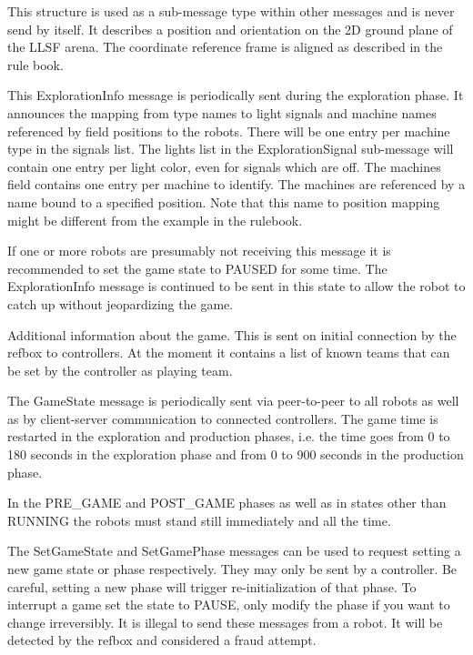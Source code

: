 \documentclass[a4paper]{article}
\begin{document}
%
{%
  This structure is used as a sub-message type within other messages
  and is never send by itself. It describes a position and orientation
  on the 2D ground plane of the LLSF arena. The coordinate reference
  frame is aligned as described in the rule book.
}

%
{%
  This ExplorationInfo message is periodically sent during the
  exploration phase. It announces the mapping from type names to light
  signals and machine names referenced by field positions to the
  robots. There will be one entry per machine type in the signals
  list. The lights list in the ExplorationSignal sub-message will
  contain one entry per light color, even for signals which are
  off. The machines field contains one entry per machine to
  identify. The machines are referenced by a name bound to a specified
  position. Note that this name to position mapping might be different
  from the example in the rulebook.

  \medskip
  If one or more robots are presumably not receiving this message it
  is recommended to set the game state to PAUSED for some time. The
  ExplorationInfo message is continued to be sent in this state to
  allow the robot to catch up without jeopardizing the game.
}

%
{%
  Additional information about the game. This is sent on initial
  connection by the refbox to controllers. At the moment it contains a
  list of known teams that can be set by the controller as playing
  team.
}

%
{%
  The GameState message is periodically sent via peer-to-peer to all
  robots as well as by client-server communication to connected
  controllers. The game time is restarted in the exploration and
  production phases, i.e. the time goes from 0 to 180 seconds in the
  exploration phase and from 0 to 900 seconds in the production phase.

  \medskip

  In the PRE\_GAME and POST\_GAME phases as well as in states other
  than RUNNING the robots must stand still immediately and all the
  time.

  \medskip

  The SetGameState and SetGamePhase messages can be used to request
  setting a new game state or phase respectively. They may only be
  sent by a controller. Be careful, setting a new phase will trigger
  re-initialization of that phase. To interrupt a game set the state
  to PAUSE, only modify the phase if you want to change
  irreversibly. It is illegal to send these messages from a robot. It
  will be detected by the refbox and considered a fraud attempt.
}
\end{document}
